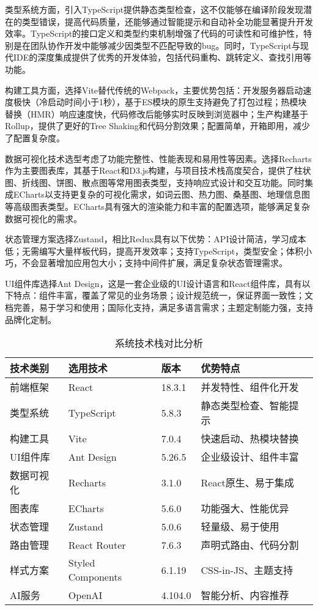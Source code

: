 \documentclass[12pt,a4paper]{article}
\begin{document}
类型系统方面，引入TypeScript提供静态类型检查，这不仅能够在编译阶段发现潜在的类型错误，提高代码质量，还能够通过智能提示和自动补全功能显著提升开发效率。TypeScript的接口定义和类型约束机制增强了代码的可读性和可维护性，特别是在团队协作开发中能够减少因类型不匹配导致的bug。同时，TypeScript与现代IDE的深度集成提供了优秀的开发体验，包括代码重构、跳转定义、查找引用等功能。

构建工具方面，选择Vite替代传统的Webpack，主要优势包括：开发服务器启动速度极快（冷启动时间小于1秒），基于ES模块的原生支持避免了打包过程；热模块替换（HMR）响应速度快，代码修改后能够实时反映到浏览器中；生产构建基于Rollup，提供了更好的Tree Shaking和代码分割效果；配置简单，开箱即用，减少了配置复杂度。

数据可视化技术选型考虑了功能完整性、性能表现和易用性等因素。选择Recharts作为主要图表库，其基于React和D3.js构建，与项目技术栈高度契合，提供了柱状图、折线图、饼图、散点图等常用图表类型，支持响应式设计和交互功能。同时集成ECharts以支持更复杂的可视化需求，如词云图、热力图、桑基图、地理信息图等高级图表类型。ECharts具有强大的渲染能力和丰富的配置选项，能够满足复杂数据可视化的需求。

状态管理方案选择Zustand，相比Redux具有以下优势：API设计简洁，学习成本低；无需编写大量样板代码，提高开发效率；支持TypeScript，类型安全；体积小巧，不会显著增加应用包大小；支持中间件扩展，满足复杂状态管理需求。

UI组件库选择Ant Design，这是一套企业级的UI设计语言和React组件库，具有以下特点：组件丰富，覆盖了常见的业务场景；设计规范统一，保证界面一致性；文档完善，易于学习和使用；国际化支持，满足多语言需求；主题定制能力强，支持品牌化定制。

\begin{table}[H]
\centering
\caption{系统技术栈对比分析}
\begin{tabular}{|p{2.5cm}|p{3cm}|p{2cm}|p{4cm}|}
\hline
\textbf{技术类别} & \textbf{选用技术} & \textbf{版本} & \textbf{优势特点} \\
\hline
前端框架 & React & 18.3.1 & 并发特性、组件化开发 \\
\hline
类型系统 & TypeScript & 5.8.3 & 静态类型检查、智能提示 \\
\hline
构建工具 & Vite & 7.0.4 & 快速启动、热模块替换 \\
\hline
UI组件库 & Ant Design & 5.26.5 & 企业级设计、组件丰富 \\
\hline
数据可视化 & Recharts & 3.1.0 & React原生、易于集成 \\
\hline
图表库 & ECharts & 5.6.0 & 功能强大、性能优异 \\
\hline
状态管理 & Zustand & 5.0.6 & 轻量级、易于使用 \\
\hline
路由管理 & React Router & 7.6.3 & 声明式路由、代码分割 \\
\hline
样式方案 & Styled Components & 6.1.19 & CSS-in-JS、主题支持 \\
\hline
AI服务 & OpenAI & 4.104.0 & 智能分析、内容推荐 \\
\hline
\end{tabular}
\end{table}
\end{document}
